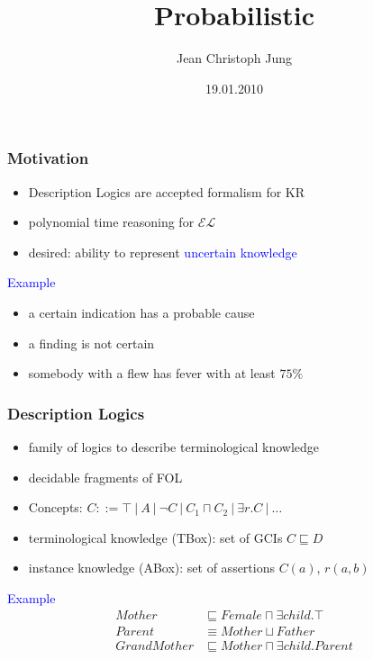 \documentclass{beamer}
\title{Probabilistic \el}
\author{Jean Christoph Jung}
\date{19.01.2010}
\institute[TdKI Bremen]{AG Theoretische Grundlagen der K\"unstlichen Intelligenz \\ Universit\"at Bremen}
\newcommand{\el}{\ensuremath{\mathcal{EL}}\xspace}
\renewcommand{\emph}[1]{\textcolor{blue}{#1}}
\begin{document}
\begin{frame}
	\titlepage
\end{frame}


\begin{frame}
  \frametitle{Motivation}
  \begin{itemize}
    \item Description Logics are accepted formalism for KR
    \item polynomial time reasoning for \el
    \item desired: ability to represent \emph{uncertain knowledge}
  \end{itemize}

  \emph{Example} 
  \begin{itemize}
    \item a certain indication has a probable cause
    \item a finding is not certain
    \item somebody with a flew has fever with at least $75\%$
  \end{itemize}
\end{frame}


\begin{frame}
  \frametitle{Description Logics}
  \begin{itemize}
    \item family of logics to describe terminological knowledge
    \item decidable fragments of FOL
    \item 
      Concepts:	$C: :=\top~|~A~|~\neg C~|~C_1\sqcap C_2~|~\exists r.C~|~\ldots$
    \item 
      terminological knowledge (TBox): set of GCIs $C\sqsubseteq D$
    \item
      instance knowledge (ABox): set of assertions $C(a)$, $r(a,b)$
  \end{itemize}
  \emph{Example}
  \begin{align*}
    Mother &\sqsubseteq Female\sqcap\exists child.\top \\
    Parent &\equiv Mother\sqcup Father \\
    GrandMother &\sqsubseteq Mother \sqcap\exists child.Parent
  \end{align*}
\end{frame}
\end{document}
